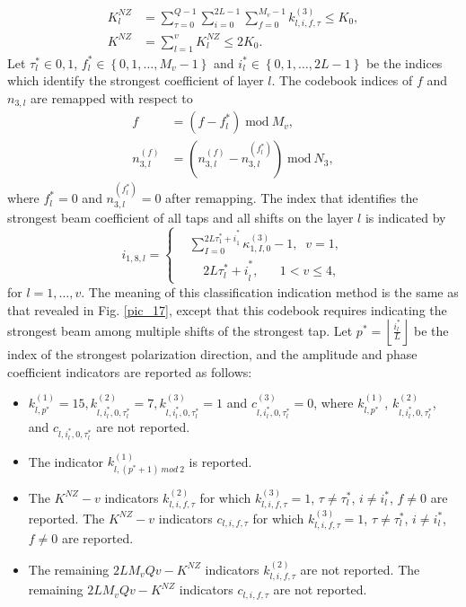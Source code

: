 \documentclass[lettersize,journal]{IEEEtran}
\begin{document}
\begin{equation}
\begin{aligned}
    K_l^{NZ}&=\sum_{\tau=0}^{Q-1}\sum_{i=0}^{2L-1}\sum_{f=0}^{M_v-1}k_{l,i,f,\tau}^{(3)}\le K_0,    \\
    K^{NZ}&=\sum_{l=1}^{v}K_l^{NZ}\le2K_0. 
\end{aligned}
\end{equation}
Let $\tau_l^\ast\in{0,1}$, $f_l^\ast\in\left\{0,1,\ldots,M_v-1\right\}$ and $i_l^\ast\in\left\{0,1,\ldots,2L-1\right\}$ be the indices which identify the strongest coefficient of layer $l$. The codebook indices of $f$ and $n_{3,l}$ are remapped with respect to
\begin{equation}
\begin{aligned}
   f&=\left(f-f_l^\ast\right)\;\mathrm{mod}\ M_v, \\
   n_{3,l}^{(f)}&=\left(n_{3,l}^{(f)}-n_{3,l}^{(f_l^\ast)}\right)\;\mathrm{mod}\ N_3, 
\end{aligned}
\end{equation}
where $f_l^\ast=0$ and $n_{3,l}^{(f_l^\ast)}=0$ after remapping. The index that identifies the strongest beam coefficient of all taps and all shifts on the layer $l$ is indicated by
\begin{equation}
{i_{1,8,l}} = \left\{ {\begin{aligned}
&{\sum\nolimits_{I=0}^{{2L\tau_1^\ast+i}_1^\ast}\kappa_{1,I,0}^{(3)}-1,\;\; v = 1, }\\
&\;\;\;\;{{2L\tau_l^\ast+i}_l^\ast ,\;\;\;\;\;\;1 < v \le 4,}
\end{aligned}} \right.
\end{equation}
for $l=1,\ldots,v$. The meaning of this classification indication method is the same as that revealed in Fig. \ref{pic_17}, except that this codebook requires indicating the strongest beam among multiple shifts of the strongest tap. Let $p^\ast=\left\lfloor\frac{i_l^\ast}{L}\right\rfloor$ be the index of the strongest polarization direction, and the amplitude and phase coefficient indicators are reported as follows:
\begin{itemize}
    \item $k_{l,p^\ast}^{(1)}=15, k_{l,i_l^\ast,0,\tau_l^\ast}^{(2)}=7, k_{l,i_l^\ast,0,\tau_l^\ast}^{(3)}=1$ and $c_{l,i_l^\ast,0,\tau_l^\ast}^{(3)}=0$, where $k_{l,p^\ast}^{(1)}$, $k_{l,i_l^\ast,0,\tau_l^\ast}^{(2)}$, and $c_{l,i_l^\ast,0,\tau_l^\ast}$ are not reported.
    \item The indicator $k_{l,(p^\ast+1)\ mod\ 2}^{(1)}$ is reported.
    \item The $K^{NZ}-v$ indicators $k_{l,i,f,\tau}^{(2)}$ for which $k_{l,i,f,\tau}^{(3)}=1$, $\tau \neq \tau_l^\ast$, $i\neq i_l^\ast$, $f\neq 0$ are reported. The $K^{NZ}-v$ indicators $c_{l,i,f,\tau}$ for which $k_{l,i,f,\tau}^{(3)}=1$, $\tau \neq \tau_l^\ast$, $i\neq i_l^\ast$, $f\neq 0$  are reported. 
    \item The remaining $2LM_vQv-K^{NZ}$ indicators $k_{l,i,f,\tau}^{(2)}$ are not reported. The remaining $2LM_vQv-K^{NZ}$ indicators $c_{l,i,f,\tau}$ are not reported.
\end{itemize}
\end{document}
